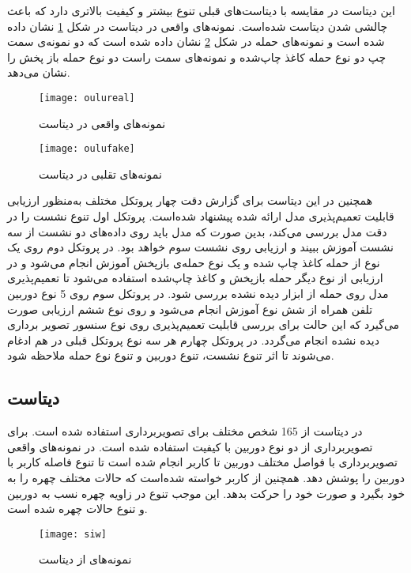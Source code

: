 این دیتاست در مقایسه با دیتاست‌های قبلی تنوع بیشتر و کیفیت بالاتری دارد که باعث چالشی شدن دیتاست شده‌است. نمونه‌های واقعی در دیتاست  در شکل 
\ref{fig:oulureal}
 نشان داده شده است و نمونه‌های حمله در شکل 
 \ref{fig:oulufake}
 نشان داده شده است که دو نمونه‌ی سمت چپ دو نوع حمله کاغذ چاپ‌شده و نمونه‌های سمت راست دو نوع حمله باز پخش را نشان می‌دهد. 
 
  \begin{figure}[h]
 	\centerline{\texttt{[image: oulureal]}}
 	\caption{نمونه‌های واقعی در دیتاست  \cite{boulkenafet2017oulu} }
 	\label{fig:oulureal}
 \end{figure}
 
 
  \begin{figure}[h]
 	\centerline{\texttt{[image: oulufake]}}
 	\caption{نمونه‌های تقلبی در دیتاست  \cite{boulkenafet2017oulu} }
 	\label{fig:oulufake}
 \end{figure}
 
همچنین در این دیتاست برای گزارش دقت چهار پروتکل مختلف به‌منظور ارزیابی قابلیت تعمیم‌پذیری مدل ارائه شده پیشنهاد شده‌است. پروتکل اول تنوع نشست را در دقت مدل بررسی می‌کند، بدین صورت که مدل باید روی داده‌های دو نشست از سه نشست آموزش ببیند و ارزیابی روی نشست سوم خواهد بود. در پروتکل دوم روی یک نوع از حمله کاغذ چاپ شده و یک نوع حمله‌ی بازپخش آموزش انجام می‌شود و در ارزیابی از نوع دیگر حمله باز‌پخش و کاغذ چاپ‌شده استفاده می‌شود تا تعمیم‌پذیری مدل روی حمله از ابزار دیده نشده بررسی شود. در پروتکل سوم روی 5 نوع دوربین تلفن همراه از شش نوع آموزش انجام می‌شود و روی نوع ششم ارزیابی صورت می‌گیرد که این حالت برای بررسی قابلیت تعمیم‌پذیری روی نوع سنسور تصویر برداری دیده نشده انجام می‌گردد. در پروتکل چهارم هر سه نوع پروتکل قبلی در هم ادغام می‌شوند تا اثر تنوع نشست، تنوع دوربین و تنوع نوع حمله ملاحظه شود.
\subsection{دیتاست }
در دیتاست 
\cite{liu2018learning}
از 165 شخص مختلف برای تصویربرداری استفاده شده است. برای تصویربرداری از دو نوع دوربین با کیفیت استفاده شده است. در نمونه‌های واقعی تصویر‌برداری با فواصل مختلف دوربین تا کاربر انجام شده است تا تنوع فاصله کاربر با دوربین را پوشش دهد. همچنین از کاربر خواسته شده‌است که حالات مختلف چهره را به خود بگیرد و صورت خود را حرکت بدهد. این موجب تنوع در زاویه چهره نسب به دوربین و تنوع حالات چهره شده است.
  \begin{figure}[h]
	\centerline{\texttt{[image: siw]}}
	\caption{نمونه‌های از دیتاست  \cite{liu2018learning} }
	\label{fig:siw}
\end{figure}
\\


